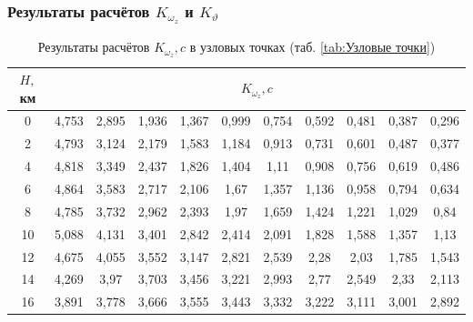     \subsubsection{Результаты расчётов $K_{\omega_z}$ и $K_\vartheta$}
    
    \begin{table}[H]
    \centering
    \caption{Результаты расчётов $K_{\omega_z}, c$ в узловых точках (таб. \ref{tab:Узловые точки})}
    \label{tab:Результаты расчётов K_{omega_z}}
    \begin{tabular}{|c|c|c|c|c|c|c|c|c|c|c|}
    \hline
        $H,$ км &\multicolumn{10}{|c|}{$K_{\omega_z}, c$} \\ \hline
        0 & 4,753 & 2,895 & 1,936 & 1,367 & 0,999 & 0,754 & 0,592 & 0,481 & 0,387 & 0,296  \\ \hline
        2 & 4,793 & 3,124 & 2,179 & 1,583 & 1,184 & 0,913 & 0,731 & 0,601 & 0,487 & 0,377  \\ \hline
        4 & 4,818 & 3,349 & 2,437 & 1,826 & 1,404 & 1,11 & 0,908 & 0,756 & 0,619 & 0,486  \\ \hline
        6 & 4,864 & 3,583 & 2,717 & 2,106 & 1,67 & 1,357 & 1,136 & 0,958 & 0,794 & 0,634  \\ \hline
        8 & 4,785 & 3,732 & 2,962 & 2,393 & 1,97 & 1,659 & 1,424 & 1,221 & 1,029 & 0,84  \\ \hline
        10 & 5,088 & 4,131 & 3,401 & 2,842 & 2,414 & 2,091 & 1,828 & 1,588 & 1,357 & 1,13  \\ \hline
        12 & 4,675 & 4,055 & 3,552 & 3,147 & 2,821 & 2,539 & 2,28 & 2,03 & 1,785 & 1,543  \\ \hline
        14 & 4,269 & 3,97 & 3,703 & 3,456 & 3,221 & 2,993 & 2,77 & 2,549 & 2,33 & 2,113  \\ \hline
        16 & 3,891 & 3,778 & 3,666 & 3,555 & 3,443 & 3,332 & 3,222 & 3,111 & 3,001 & 2,892  \\ \hline
    \end{tabular}
\end{table}

